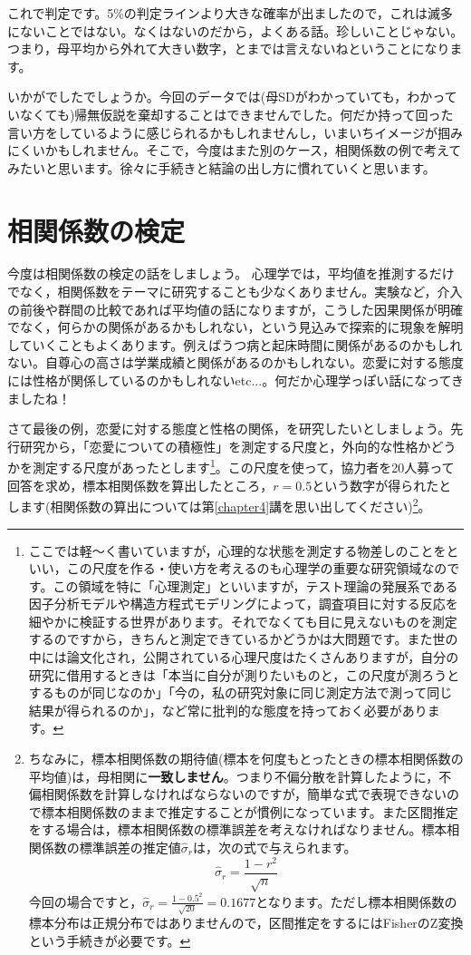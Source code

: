 \documentclass{ltjsbook}
\begin{document}
これで判定です。5\%の判定ラインより大きな確率が出ましたので，これは滅多にないことではない。なくはないのだから，よくある話。珍しいことじゃない。つまり，母平均から外れて大きい数字，とまでは言えないねということになります。

いかがでしたでしょうか。今回のデータでは(母SDがわかっていても，わかっていなくても)帰無仮説を棄却することはできませんでした。何だか持って回った言い方をしているように感じられるかもしれませんし，いまいちイメージが掴みにくいかもしれません。そこで，今度はまた別のケース，相関係数の例で考えてみたいと思います。徐々に手続きと結論の出し方に慣れていくと思います。

\section{相関係数の検定}
今度は相関係数の検定の話をしましょう。
心理学では，平均値を推測するだけでなく，相関係数をテーマに研究することも少なくありません。実験など，介入の前後や群間の比較であれば平均値の話になりますが，こうした因果関係が明確でなく，何らかの関係があるかもしれない，という見込みで探索的に現象を解明していくこともよくあります。例えばうつ病と起床時間に関係があるのかもしれない。自尊心の高さは学業成績と関係があるのかもしれない。恋愛に対する態度には性格が関係しているのかもしれないetc...。何だか心理学っぽい話になってきましたね！

さて最後の例，恋愛に対する態度と性格の関係，を研究したいとしましょう。先行研究から，「恋愛についての積極性」を測定する尺度と，外向的な性格かどうかを測定する尺度があったとします\footnote{ここでは軽〜く書いていますが，心理的な状態を測定する物差しのことをといい，この尺度を作る・使い方を考えるのも心理学の重要な研究領域なのです。この領域を特に「心理測定」といいますが，テスト理論の発展系である因子分析モデルや構造方程式モデリングによって，調査項目に対する反応を細やかに検証する世界があります。それでなくても目に見えないものを測定するのですから，きちんと測定できているかどうかは大問題です。また世の中には論文化され，公開されている心理尺度はたくさんありますが，自分の研究に借用するときは「本当に自分が測りたいものと，この尺度が測ろうとするものが同じなのか」「今の，私の研究対象に同じ測定方法で測って同じ結果が得られるのか」，など常に批判的な態度を持っておく必要があります。}。この尺度を使って，協力者を20人募って回答を求め，標本相関係数を算出したところ，$r=0.5$という数字が得られたとします(相関係数の算出については第\ref{chapter4}講を思い出してください)\footnote{ちなみに，標本相関係数の期待値(標本を何度もとったときの標本相関係数の平均値)は，母相関に\textbf{一致しません}。つまり不偏分散を計算したように，不偏相関係数を計算しなければならないのですが，簡単な式で表現できないので標本相関係数のままで推定することが慣例になっています\citep{南風原200206,平川2021}。また区間推定をする場合は，標本相関係数の標準誤差を考えなければなりません。標本相関係数の標準誤差の推定値$\hat{\sigma}_r$は，次の式で与えられます。
$$\hat{\sigma}_r= \frac{1-r^2}{\sqrt{n}}$$
今回の場合ですと，$\hat{\sigma}_r = \frac{1-0.5^2}{\sqrt{20} }= 0.1677$となります。ただし標本相関係数の標本分布は正規分布ではありませんので，区間推定をするにはFisherのZ変換という手続きが必要です。}。
\end{document}
